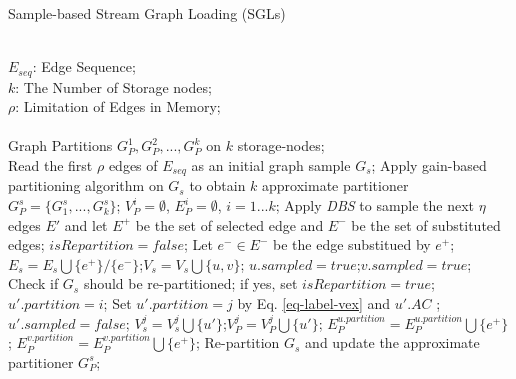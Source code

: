 \documentclass{sig-alternate-2013}
\begin{document}
\begin{algorithm}[!htbp]
\renewcommand{\algorithmicrequire}{\textbf{Input:}}
\renewcommand\algorithmicensure {\textbf{Output:} }
\caption{Sample-based Stream Graph Loading (SGLs)}
\label{alg:streaming-loading}
\begin{algorithmic}[1]
\REQUIRE ~~\\
$E_{seq}$: Edge Sequence;\\
$k$: The Number of Storage nodes;\\
$\rho$: Limitation of Edges in Memory;\\
\ENSURE ~~\\
Graph Partitions $G_P^1,G_P^2,...,G_P^k$ on $k$ storage-nodes;\\

\STATE Read the first $\rho$ edges of $E_{seq}$ as an initial graph sample $G_s$;
\STATE Apply gain-based partitioning algorithm on $G_s$ to obtain $k$ approximate partitioner $G_P^s=\{G_1^s,...,G_k^s\}$;
\STATE $V_P^i=\emptyset$, $E_P^i=\emptyset$, $i=1...k$;
\REPEAT
   \STATE Apply \textit{DBS} to sample the next $\eta$ edges $E'$ and let $E^+$ be the set of selected edge and $E^-$ be the set of substituted edges;
   \STATE $isRepartition = false$;
     \label{alg-sgl-stream-adjust-partitioner-begin}
       \STATE Let $e^- \in E^-$ be the edge substitued by $e^+$;
        \STATE $E_s = E_s\bigcup\{e^+\}/\{e^-\}$;$V_s = V_s \bigcup \{u,v\}$;
        \STATE $u.sampled = true$;$ v.sampled = true$;
        \STATE Check if $G_s$ should be re-partitioned; if yes, set $isRepartition = true$;\label{alg-sgl-stream-adjust-partitioner-end}
     \ELSE
         \label{alg-sgl-stream-allocate-edge-begin}
	            \STATE $u'.partition = i$;
            \ELSE
	            \STATE Set $u'.partition=j$ by Eq. \ref{eq-label-vex} and $u'.AC$ ;
                \STATE $u'.sampled=false$;
                \STATE $V_s^j = V_s^j\bigcup\{u'\}$;$V_P^j = V_P^j\bigcup\{u'\}$;
            \ENDIF
        \ENDFOR
        \STATE $E_P^{u.partition}=E_P^{u.partition}\bigcup\{e^+\}$;
        \STATE $E_P^{v.partition}=E_P^{v.partition}\bigcup\{e^+\}$;
       \ENDIF \label{alg-sgl-stream-allocate-edge-end}
      \ENDFOR
      \label{alg-sgl-stream-repartition-begin}
        \STATE Re-partition $G_s$ and update the approximate partitioner $G_P^s$;
      \ENDIF \label{alg-sgl-stream-repartition-end}

\end{algorithmic}
\end{algorithm}
\end{document}
